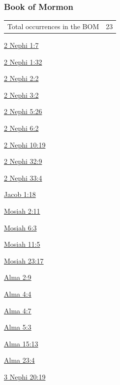 		
	\subsubsection{Book of Mormon} %
		\label{CONSECRATION-BOM}
	
		\begin{tabular}{ll}
			Total occurrences in the BOM & 23
		\end{tabular}
		
		\begin{compactdesc}
			\item[{\hyperref[2NEPHI-1-7]{2 Nephi 1:7}}]
			\item[{\hyperref[2NEPHI-1-32]{2 Nephi 1:32}}]
			\item[{\hyperref[2NEPHI-2-2]{2 Nephi 2:2}}]
			\item[{\hyperref[2NEPHI-3-2]{2 Nephi 3:2}}]
			\item[{\hyperref[2NEPHI-5-26]{2 Nephi 5:26}}]
			\item[{\hyperref[2NEPHI-6-2]{2 Nephi 6:2}}]
			\item[{\hyperref[2NEPHI-10-19]{2 Nephi 10:19}}]
			\item[{\hyperref[2NEPHI-32-9]{2 Nephi 32:9}}]
			\item[{\hyperref[2NEPHI-33-4]{2 Nephi 33:4}}]
			\item[{\hyperref[JACOB-1-18]{Jacob 1:18}}]
			\item[{\hyperref[MOSIAH-2-11]{Mosiah 2:11}}]
			\item[{\hyperref[MOSIAH-6-3]{Mosiah 6:3}}]
			\item[{\hyperref[MOSIAH-11-5]{Mosiah 11:5}}]
			\item[{\hyperref[MOSIAH-23-17]{Mosiah 23:17}}]
			\item[{\hyperref[ALMA-2-9]{Alma 2:9}}]
			\item[{\hyperref[ALMA-4-4]{Alma 4:4}}]
			\item[{\hyperref[ALMA-4-7]{Alma 4:7}}]
			\item[{\hyperref[ALMA-5-3]{Alma 5:3}}]
			\item[{\hyperref[ALMA-15-13]{Alma 15:13}}]
			\item[{\hyperref[ALMA-23-4]{Alma 23:4}}]
			\item[{\hyperref[3NEPHI-20-19]{3 Nephi 20:19}}]
		\end{compactdesc}
		
